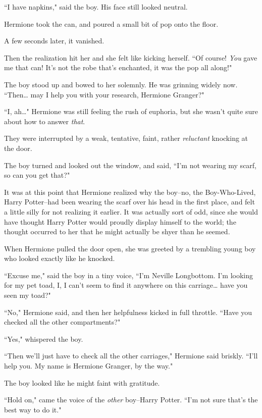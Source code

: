 ``I have napkins," said the boy. His face still looked neutral.

Hermione took the can, and poured a small bit of pop onto the floor.

A few seconds later, it vanished.

Then the realization hit her and she felt like kicking herself. ``Of course! \emph{You} gave me that can! It's not the robe that's enchanted, it was the pop all along!"

The boy stood up and bowed to her solemnly. He was grinning widely now. ``Then{\ldots} may I help you with your research, Hermione Granger?"

``I, ah{\ldots}" Hermione was still feeling the rush of euphoria, but she wasn't quite sure about how to answer \emph{that}.

They were interrupted by a weak, tentative, faint, rather \emph{reluctant} knocking at the door.

The boy turned and looked out the window, and said, ``I'm not wearing my scarf, so can you get that?"

It was at this point that Hermione realized why the boy\---no, the Boy-Who-Lived, Harry Potter\---had been wearing the scarf over his head in the first place, and felt a little silly for not realizing it earlier. It was actually sort of odd, since she would have thought Harry Potter would proudly display himself to the world; the thought occurred to her that he might actually be shyer than he seemed.

When Hermione pulled the door open, she was greeted by a trembling young boy who looked exactly like he knocked.

``Excuse me," said the boy in a tiny voice, ``I'm Neville Longbottom. I'm looking for my pet toad, I, I can't seem to find it anywhere on this carriage{\ldots} have you seen my toad?"

``No," Hermione said, and then her helpfulness kicked in full throttle. ``Have you checked all the other compartments?"

``Yes," whispered the boy.

``Then we'll just have to check all the other carriages," Hermione said briskly. ``I'll help you. My name is Hermione Granger, by the way."

The boy looked like he might faint with gratitude.

``Hold on," came the voice of the \emph{other} boy\---Harry Potter. ``I'm not sure that's the best way to do it."


